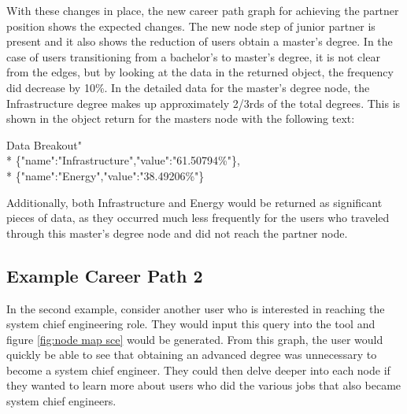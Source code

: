 With these changes in place, the new career path graph for achieving the partner
position shows the expected changes.  The new node step of junior partner is
present and it also shows the reduction of users obtain a master's degree.  In
the case of users transitioning from a bachelor's to master's degree, it is not
clear from the edges, but by looking at the data in the returned object, the
frequency did decrease by 10\%.  In the detailed data for the master's degree
node, the Infrastructure degree makes up approximately 2/3rds of the total
degrees.  This is shown in the object return for the masters node with the
following text:

\begin{tt}
\begin{footnotesize}
\indent Data Breakout"\\*
\indent \indent \indent \{"name":"Infrastructure","value":"61.50794\%"\},\\*
\indent \indent \indent \{"name":"Energy","value":"38.49206\%"\}
\end{footnotesize}
\end{tt}

\noindent Additionally, both Infrastructure and Energy would be returned as
significant pieces of data, as they occurred much less frequently for the users
who traveled through this master's degree node and did not reach the partner
node.

\subsection{Example Career Path 2 }
In the second example, consider another user who is interested in reaching the
system chief engineering role.  They would input this query into the tool and
figure \ref{fig:node map sce} would be generated.  From this graph, the user
would quickly be able to see that obtaining an advanced degree was unnecessary
to become a system chief engineer.  They could then delve deeper into each node
if they wanted to learn more about users who did the various jobs that also
became system chief engineers.


\usetikzlibrary{shapes,arrows,chains}

